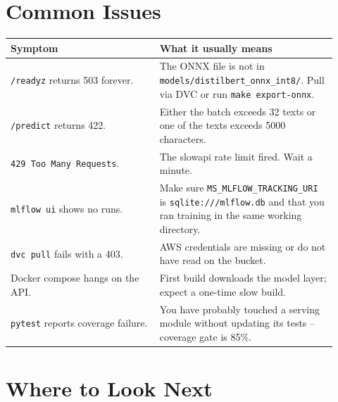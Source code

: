 \documentclass[11pt,a4paper]{article}
\begin{document}
\section{Common Issues}

\begin{longtable}{@{}p{0.42\linewidth}p{0.5\linewidth}@{}}
\toprule
\textbf{Symptom} & \textbf{What it usually means} \\ \midrule \endhead
\texttt{/readyz} returns 503 forever. & The ONNX file is not in
                                        \texttt{models/distilbert\_onnx\_int8/}.
                                        Pull via DVC or run \texttt{make export-onnx}. \\
\texttt{/predict} returns 422. & Either the batch exceeds 32 texts or one of the
                                 texts exceeds 5000 characters. \\
\texttt{429 Too Many Requests}. & The slowapi rate limit fired. Wait a minute. \\
\texttt{mlflow ui} shows no runs. & Make sure \texttt{MS\_MLFLOW\_TRACKING\_URI} is
                                    \texttt{sqlite:///mlflow.db} and that you ran
                                    training in the same working directory. \\
\texttt{dvc pull} fails with a 403. & AWS credentials are missing or do not have
                                      read on the bucket. \\
Docker compose hangs on the API. & First build downloads the model layer; expect
                                   a one-time slow build. \\
\texttt{pytest} reports coverage failure. & You have probably touched a serving
                                            module without updating its tests --
                                            coverage gate is 85\%. \\
\bottomrule
\end{longtable}

\section{Where to Look Next}
\end{document}
